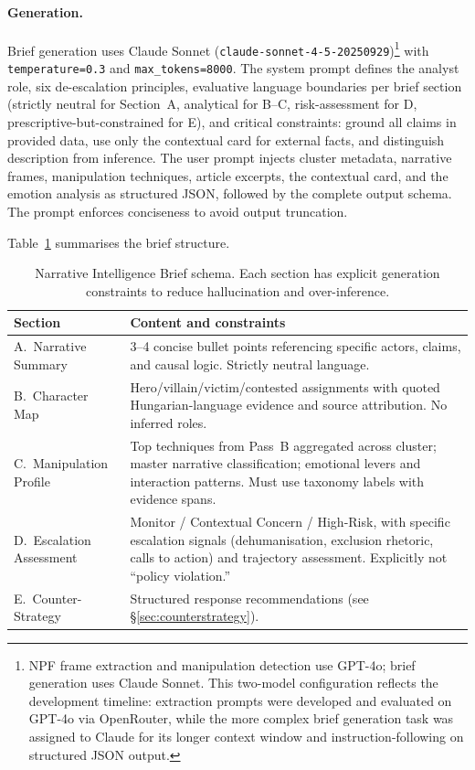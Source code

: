 \documentclass[10pt, a4paper]{article}
\begin{document}
\paragraph{Generation.}
Brief generation uses Claude Sonnet (\texttt{claude-sonnet-4-5-20250929})\footnote{NPF frame extraction and manipulation detection use GPT-4o; brief generation uses Claude Sonnet. This two-model configuration reflects the development timeline: extraction prompts were developed and evaluated on GPT-4o via OpenRouter, while the more complex brief generation task was assigned to Claude for its longer context window and instruction-following on structured JSON output.} with \texttt{temperature=0.3} and \texttt{max\_tokens=8000}. The system prompt defines the analyst role, six de-escalation principles, evaluative language boundaries per brief section (strictly neutral for Section~A, analytical for B--C, risk-assessment for D, prescriptive-but-constrained for E), and critical constraints: ground all claims in provided data, use only the contextual card for external facts, and distinguish description from inference. The user prompt injects cluster metadata, narrative frames, manipulation techniques, article excerpts, the contextual card, and the emotion analysis as structured JSON, followed by the complete output schema. The prompt enforces conciseness to avoid output truncation.

Table~\ref{tab:brief_schema} summarises the brief structure.

\begin{table}[!ht]
\begin{center}
\begin{tabularx}{\columnwidth}{|l|X|}
  \hline
  \textbf{Section} & \textbf{Content and constraints} \\
  \hline
  A.~Narrative Summary & 3--4 concise bullet points referencing specific actors, claims, and causal logic. Strictly neutral language. \\
  \hline
  B.~Character Map & Hero/villain/victim/contested assignments with quoted Hungarian-language evidence and source attribution. No inferred roles. \\
  \hline
  C.~Manipulation Profile & Top techniques from Pass~B aggregated across cluster; master narrative classification; emotional levers and interaction patterns. Must use taxonomy labels with evidence spans. \\
  \hline
  D.~Escalation Assessment & Monitor / Contextual Concern / High-Risk, with specific escalation signals (dehumanisation, exclusion rhetoric, calls to action) and trajectory assessment. Explicitly not ``policy violation.'' \\
  \hline
  E.~Counter-Strategy & Structured response recommendations (see \S\ref{sec:counterstrategy}). \\
  \hline
\end{tabularx}
\caption{Narrative Intelligence Brief schema. Each section has explicit generation constraints to reduce hallucination and over-inference.}
\label{tab:brief_schema}
\end{center}
\end{table}
\end{document}
